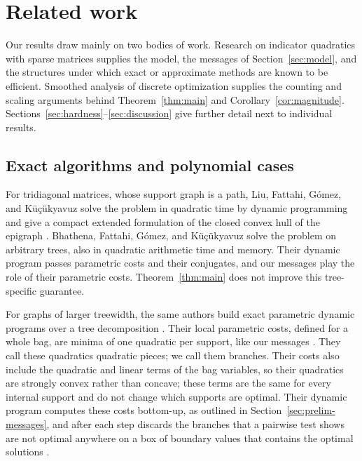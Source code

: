\section{Related work}\label{sec:related}
Our results draw mainly on two bodies of work. Research on indicator
quadratics with sparse matrices supplies the model, the messages of
Section~\ref{sec:model}, and the structures under which exact or
approximate methods are known to be efficient. Smoothed analysis of
discrete optimization supplies the counting and scaling arguments behind
Theorem~\ref{thm:main} and Corollary~\ref{cor:magnitude}.
Sections~\ref{sec:hardness}--\ref{sec:discussion} give further detail
next to individual results.

\subsection{Exact algorithms and polynomial cases}
For tridiagonal matrices, whose support graph is a path, Liu, Fattahi,
G\'omez, and K\"u\c{c}\"ukyavuz solve the problem in quadratic time by
dynamic programming and give a compact extended formulation of the
closed convex hull of the epigraph \cite{LiuPath}. Bhathena, Fattahi,
G\'omez, and K\"u\c{c}\"ukyavuz \cite{BhathenaTrees} solve the problem
on arbitrary trees, also in quadratic arithmetic time and memory. Their
dynamic program passes parametric costs and their conjugates, and our
messages play the role of their parametric costs.
Theorem~\ref{thm:main} does not improve this tree-specific guarantee.

For graphs of larger treewidth, the same authors build exact parametric
dynamic programs over a tree decomposition \cite{BhathenaStructured}.
Their local parametric costs, defined for a whole bag, are minima of one
quadratic per support, like our messages \cite[Section~2.2 and
Lemma~1]{BhathenaStructured}. They call these quadratics quadratic
pieces; we call them branches. Their costs also include the quadratic
and linear terms of the bag variables, so their quadratics are strongly
convex rather than concave; these terms are the same for every internal
support and do not change which supports are optimal. Their dynamic
program computes these costs bottom-up, as outlined in
Section~\ref{sec:prelim-messages}, and after each step discards the
branches that a pairwise test shows are not optimal anywhere on a box of
boundary values that contains the optimal solutions
\cite[Definition~3 and Section~5]{BhathenaStructured}.

